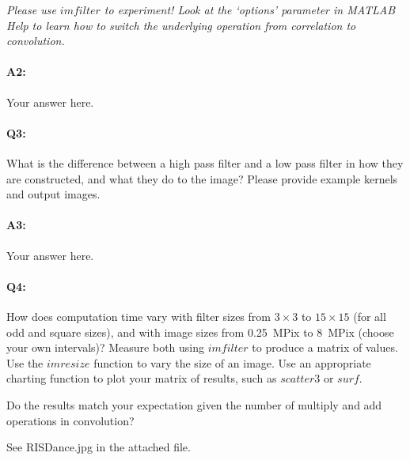 	\emph{Please use \href{https://www.mathworks.com/help/images/ref/imfilter.html}{$imfilter$} to experiment! Look at the `options' parameter in MATLAB Help to learn how to switch the underlying operation from correlation to convolution.}
	
	\paragraph{A2:} Your answer here.
	
	
	
	
	\pagebreak
	\paragraph{Q3:} What is the difference between a high pass filter and a low pass filter in how they are constructed, and what they do to the image? Please provide example kernels and output images.
	
	\paragraph{A3:} Your answer here.
	
	
	
	
	\pagebreak
	\paragraph{Q4:} How does computation time vary with filter sizes from $3\times3$ to $15\times15$ (for all odd and square sizes), and with image sizes from 0.25~MPix to 8~MPix (choose your own intervals)? Measure both using \href{https://www.mathworks.com/help/images/ref/imfilter.html}{$imfilter$} to produce a matrix of values. Use the \href{https://www.mathworks.com/help/images/ref/imresize.html}{$imresize$} function to vary the size of an image. Use an appropriate charting function to plot your matrix of results, such as \href{https://www.mathworks.com/help/matlab/ref/scatter3.html}{$scatter3$} or \href{https://www.mathworks.com/help/matlab/ref/surf.html}{$surf$}.
	
	Do the results match your expectation given the number of multiply and add operations in convolution?
	
	See RISDance.jpg in the attached file.
	
